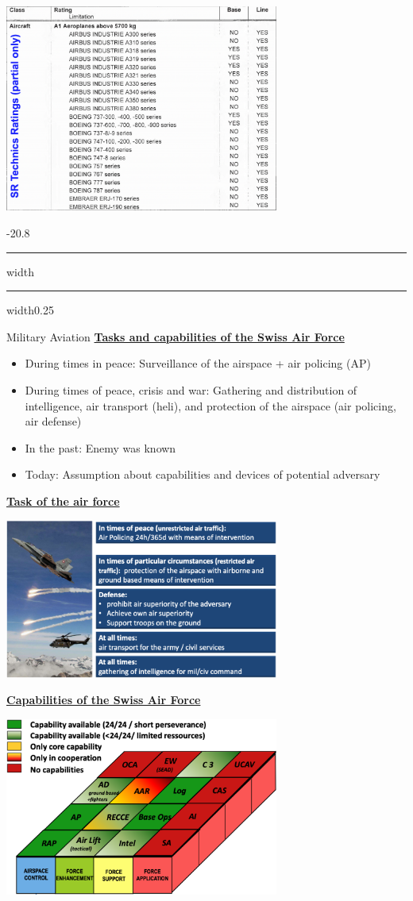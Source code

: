 \documentclass[9pt, landscape, fleqn]{scrartcl}
\makeatletter
\renewcommand{\section}{\@startsection{section}{1}{0mm}%
{-2\baselineskip}{0.8\baselineskip}%
{\hrule depth 0.2pt width\columnwidth\hrule depth1.5pt
width0.25\columnwidth\vspace*{1.2em}\Large\bfseries\rmfamily}}
\makeatother
\begin{document}
\begin{multicols*}{3}
\begin{center}
    \includegraphics[width=9cm]{Images/Maintenance Rating.png}
\end{center}
\newpage
\section{Military Aviation}
\underline{\textbf{Tasks and capabilities of the Swiss Air Force}}
\begin{itemize}
    \item During times in peace: Surveillance of the airspace + air policing (AP)
    \item During times of peace, crisis and war: Gathering and distribution of intelligence, air transport (heli), and protection of the airspace (air policing, air defense)
    \item In the past: Enemy was known 
    \item Today: Assumption about capabilities and devices of potential adversary
\end{itemize}
\underline{\textbf{Task of the air force}}
\begin{center}
    \includegraphics[width=9cm]{Images/Tasks of the air force.png}
\end{center}
\underline{\textbf{Capabilities of the Swiss Air Force}}
\begin{center}
    \includegraphics[width=9cm]{Images/Capabilities of the Swiss Air Force.png}

\end{center}
\end{multicols*}
\end{document}
